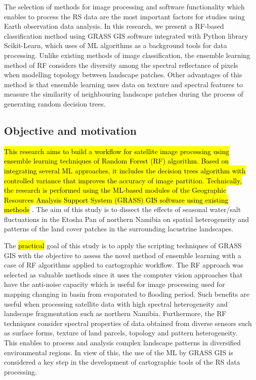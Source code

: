 \documentclass[climate,article,submit,pdftex,moreauthors]{Definitions/mdpi}
\begin{document}
The selection of methods for image processing and software functionality which enables to process the RS data are the most important factors for studies using Earth observation data analysis. In this research, we present a RF-based classification method using GRASS GIS software integrated with Python library Scikit-Learn, which uses  of ML algorithms as a background tools for data processing. Unlike existing methods of image classification, the ensemble learning method of RF considers the diversity among the spectral reflectance of pixels when modelling topology between landscape patches. Other advantages of this method is that ensemble learning uses data on texture and spectral features to measure the similarity of neighbouring landscape patches during the process of generating random decision trees. 

\subsection{Objective and motivation}

\hl{This research aims to build a workflow for satellite image processing using ensemble learning techniques of Random Forest (RF) algorithm. Based on integrating several ML approaches, it includes the decision trees algorithm with controlled variance that improves the accuracy of image partition. Technically, the research is performed using the ML-based modules of the Geographic Resources Analysis Support System (GRASS) GIS software using existing methods} \cite{lemenkova2025automation}. The aim of this study is to dissect the effects of seasonal water/salt fluctuations in the Etosha Pan of northern Namibia on spatial heterogeneity and patterns of the land cover patches in the surrounding lacustrine landscapes. 

The \hl{practical }goal of this study is to apply the scripting techniques of GRASS GIS with the objective to assess the novel method of ensemble learning with a case of RF algorithms applied to cartographic workflow. The RF approach was selected as valuable methods since it uses the computer vision approaches that have the anti-noise capacity which is useful for image processing used for mapping changing in basin from evaporated to flooding period. Such benefits are useful when processing satellite data with high spectral heterogeneity and landscape fragmentation such as northern Namibia. Furthermore, the RF techniques consider spectral properties of data obtained from diverse sensors such as surface forms, texture of land parcels, topology and pattern heterogeneity. This enables to process and analysis complex landscape patterns in diversified environmental regions. In view of this, the use of the ML by GRASS GIS is considered a key step in the development of cartographic tools of the RS data processing.
\end{document}
